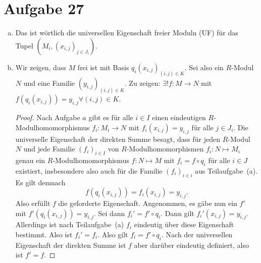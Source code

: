 \documentclass{article}
\theoremstyle{definition}
\begin{document}
\section*{Aufgabe 27}
\begin{enumerate}[(a)]
    \item Das ist wörtlich die universellen Eigenschaft freier Moduln (UF) für das Tupel $(M_i, (x_{i,j})_{j\in J_i})$.
    \item Wir zeigen, dass $M$ frei ist mit Basis $q_i(x_{i,j})_{(i,j)\in K}$. Sei also ein $R$-Modul $N$ und eine Familie $(y_{i,j})_{(i,j)\in K}$. Zu zeigen: $\exists ! f : M \to N$ mit $f(q_i(x_{i,j})) = y_{i,j} \forall (i,j)\in K$.
    \begin{proof}
        Nach Aufgabe $a$ gibt es für alle $i\in I$ einen eindeutigen $R$-Modulhomomorphismus $f_i : M_i \to N$ mit $f_i(x_{i,j})= y_{i,j}$ für alle $j\in J_i$. Die universelle Eigenschaft der direkten Summe besagt, dass für jeden $R$-Modul $N$ und jede Familie $(f_i)_{i\in I}$ von $R$-Modulhomomorphismen $f_i:N\mapsto M_i$ genau ein $R$-Modulhomomorphismus $f:N\mapsto M $ mit $f_i=f\circ q_i$ für alle $i\in J$ existiert, insbesondere also auch für die Familie $(f_i)_{i\in i}$ aus Teilaufgabe~(a). Es gilt demnach \[f(q_i(x_{i,j})) = f_i(x_{i,j}) = y_{i,j}.\]
        Also erfüllt $f$ die geforderte Eigenschaft. Angenommen, es gäbe nun ein $f'$ mit $f'(q_i(x_{i,j})) = y_{i,j}$. Sei dann $f_i' = f'\circ q_i$. Dann gilt $f_i' (x_{i,j}) = y_{i,j}$. Allerdings ist nach Teilaufgabe~(a) $f_i$ eindeutig über diese Eigenschaft bestimmt. Also ist $f_i' = f_i$. Also gilt $f_i = f' \circ q_i$. Nach der universellen Eigenschaft der direkten Summe ist $f$ aber darüber eindeutig definiert, also ist $f' = f$. 
    \end{proof}
\end{enumerate}
\end{document}
